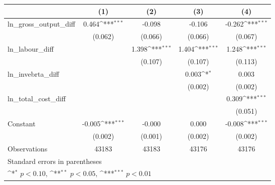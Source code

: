 {
\def\sym#1{\ifmmode^{#1}\else\(^{#1}\)\fi}
\begin{tabular}{l*{4}{c}}
\hline\hline
                &\multicolumn{1}{c}{(1)}         &\multicolumn{1}{c}{(2)}         &\multicolumn{1}{c}{(3)}         &\multicolumn{1}{c}{(4)}         \\
\hline
ln\_gross\_output\_diff&    0.464\sym{***}&   -0.098         &   -0.106         &   -0.262\sym{***}\\
                &  (0.062)         &  (0.066)         &  (0.066)         &  (0.067)         \\
[1em]
ln\_labour\_diff  &                  &    1.398\sym{***}&    1.404\sym{***}&    1.248\sym{***}\\
                &                  &  (0.107)         &  (0.107)         &  (0.113)         \\
[1em]
ln\_invebrta\_diff&                  &                  &    0.003\sym{*}  &    0.003         \\
                &                  &                  &  (0.002)         &  (0.002)         \\
[1em]
ln\_total\_cost\_diff&                  &                  &                  &    0.309\sym{***}\\
                &                  &                  &                  &  (0.051)         \\
[1em]
Constant        &   -0.005\sym{***}&   -0.000         &    0.000         &   -0.008\sym{***}\\
                &  (0.002)         &  (0.001)         &  (0.002)         &  (0.002)         \\
\hline
Observations    &    43183         &    43183         &    43176         &    43176         \\
\hline\hline
\multicolumn{5}{l}{\footnotesize Standard errors in parentheses}\\
\multicolumn{5}{l}{\footnotesize \sym{*} \(p<0.10\), \sym{**} \(p<0.05\), \sym{***} \(p<0.01\)}\\
\end{tabular}
}
